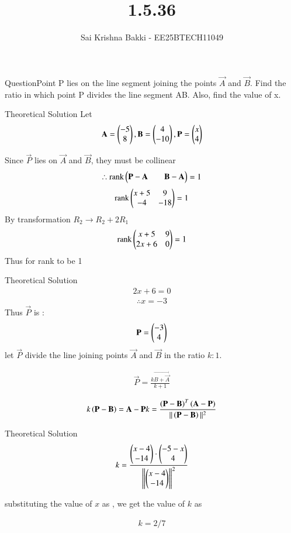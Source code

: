 \documentclass{beamer}
\title %
{1.5.36}
\date{}
\author %
{Sai Krishna Bakki - EE25BTECH11049}
\begin{document}
\frame{\titlepage}
\begin{frame}{Question}Point P lies on the line segment joining the points $\vec{A}$ and $\vec{B}$. Find the ratio in which point P divides the line segment AB. Also, find the value of x.
\end{frame}
\begin{frame}{Theoretical Solution}
Let 
\begin{align}
\mathbf{A}= \begin{pmatrix}-5 \\ 8\end{pmatrix}, \mathbf{B}= \begin{pmatrix}4 \\ -10\end{pmatrix} , \mathbf{P} = \begin{pmatrix}x \\ 4\end{pmatrix}
\end{align}    

Since $\vec{P}$ lies on $\vec{A}$ and $\vec{B}$, they must be collinear
\begin{align}
\therefore \text{rank}\begin{pmatrix}\mathbf{P} - \mathbf{A} & &\mathbf{B} - \mathbf{A}\end{pmatrix} = 1
\end{align}
\begin{align}
    \text{rank}\begin{pmatrix}x+5 & 9 \\ -4 & -18\end{pmatrix} = 1
\end{align}
By transformation $R_2 \rightarrow R_2 + 2R_1$
\begin{align}
    \text{rank}\begin{pmatrix}x+5 & 9 \\ 2x+6 & 0\end{pmatrix} = 1
\end{align}
Thus for rank to be 1
\end{frame}
\begin{frame}{Theoretical Solution}
 \begin{align}
    2x+6 = 0
\end{align}
\begin{align}
\therefore x = -3
\end{align}
Thus $\vec{P}$ is :
\begin{align}
    \mathbf{P} = \begin{pmatrix}-3 \\ 4\end{pmatrix}
\end{align}
let $\vec{P}$ divide the line joining points $\vec{A}$ and $\vec{B}$ in the ratio $k:1$.

\begin{align*}
    \vec{P}=\frac{k\vec{B+\vec{A}}}{k+1}
\end{align*}

\begin{align*}
    k\left(\mathbf{P}- \mathbf{B}\right) = \mathbf{A}-\mathbf{P}
k=\frac{\left(\mathbf{P}-\mathbf{B}\right)^T\left(\mathbf{A}-\mathbf{P}\right)}{||\left(\mathbf{P}-\mathbf{B}\right)||^2}    
\end{align*}
\end{frame}
\begin{frame}{Theoretical Solution}
\begin{align*}
    k=\frac{\begin{pmatrix}x-4 \\ -14\end{pmatrix} \cdot \begin{pmatrix}-5-x\\4\end{pmatrix}}{{\left\lVert\begin{pmatrix}x-4 \\ -14\end{pmatrix}\right\rVert}^2}
\end{align*}

substituting the value of $x$ as , we get the value of $k$ as

\begin{align*}
    k=2/7
\end{align*}
\end{frame}
\end{document}
